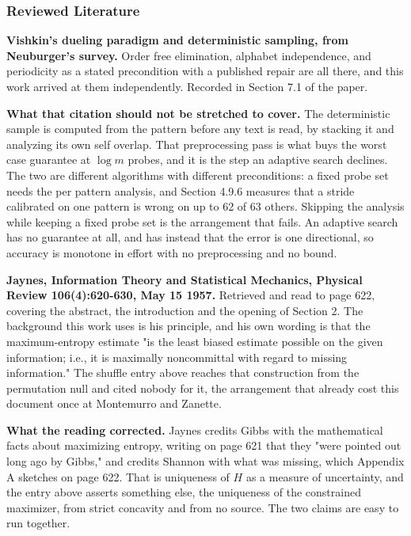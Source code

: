 \subsubsection{Reviewed Literature}

\textbf{Vishkin's dueling paradigm and deterministic sampling, from Neuburger's survey.} Order free elimination, alphabet independence, and periodicity as a stated precondition with a published repair are all there, and this work arrived at them independently. Recorded in Section 7.1 of the paper.

\textbf{What that citation should not be stretched to cover.} The deterministic sample is computed from the pattern before any text is read, by stacking it and analyzing its own self overlap. That preprocessing pass is what buys the worst case guarantee at \(\log m\) probes, and it is the step an adaptive search declines. The two are different algorithms with different preconditions: a fixed probe set needs the per pattern analysis, and Section 4.9.6 measures that a stride calibrated on one pattern is wrong on up to 62 of 63 others. Skipping the analysis while keeping a fixed probe set is the arrangement that fails. An adaptive search has no guarantee at all, and has instead that the error is one directional, so accuracy is monotone in effort with no preprocessing and no bound.

\textbf{Jaynes, Information Theory and Statistical Mechanics, Physical Review 106(4):620-630, May 15 1957.} Retrieved and read to page 622, covering the abstract, the introduction and the opening of Section 2. The background this work uses is his principle, and his own wording is that the maximum-entropy estimate "is the least biased estimate possible on the given information; i.e., it is maximally noncommittal with regard to missing information." The shuffle entry above reaches that construction from the permutation null and cited nobody for it, the arrangement that already cost this document once at Montemurro and Zanette.

\textbf{What the reading corrected.} Jaynes credits Gibbs with the mathematical facts about maximizing entropy, writing on page 621 that they "were pointed out long ago by Gibbs," and credits Shannon with what was missing, which Appendix A sketches on page 622. That is uniqueness of \(H\) as a measure of uncertainty, and the entry above asserts something else, the uniqueness of the constrained maximizer, from strict concavity and from no source. The two claims are easy to run together.

